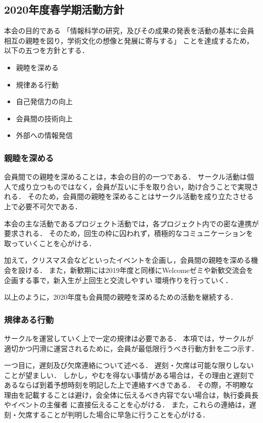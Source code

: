 \subsection*{2020年度春学期活動方針}


本会の目的である
「情報科学の研究，及びその成果の発表を活動の基本に会員相互の親睦を図り，学術文化の想像と発展に寄与する」
ことを達成するため，以下の五つを方針とする．

\begin{itemize}
  \item 親睦を深める
  \item 規律ある行動
  \item 自己発信力の向上
  \item 会員間の技術向上
  \item 外部への情報発信
\end{itemize}

\subsubsection*{親睦を深める}
  会員間での親睦を深めることは，本会の目的の一つである．
  サークル活動は個人で成り立つものではなく，会員が互いに手を取り合い，助け合うことで実現される．
  そのため，会員間の親睦を深めることはサークル活動を成り立たさせる上で必要不可欠である．

  本会の主な活動であるプロジェクト活動では，各プロジェクト内での密な連携が要求される．
  そのため，回生の枠に囚われず，積極的なコミュニケーションを取っていくことを心がける．

  加えて，クリスマス会などといったイベントを企画し，会員間の親睦を深める機会を設ける．
  また，新歓期には2019年度と同様にWelcomeゼミや新歓交流会を企画する事で，新入生が上回生と交流しやすい
  環境作りを行っていく．

  以上のように，2020年度も会員間の親睦を深めるための活動を継続する．

\subsubsection*{規律ある行動}
  サークルを運営していく上で一定の規律は必要である．
  本項では，サークルが適切かつ円滑に運営されるために，会員が最低限行うべき行動方針を二つ示す．

  一つ目に，遅刻及び欠席連絡について述べる．
  遅刻・欠席は可能な限りしないことが望ましい．
  しかし，やむを得ない事情がある場合は，その理由と遅刻であるならば到着予想時刻を明記した上で連絡すべきである．
  その際，不明瞭な理由を記載することは避け，会全体に伝えるべき内容でない場合は，執行委員長やイベントの主催者
  に直接伝えることを心がける．
  また，これらの連絡は，遅刻・欠席することが判明した場合に早急に行うことを心がける．

